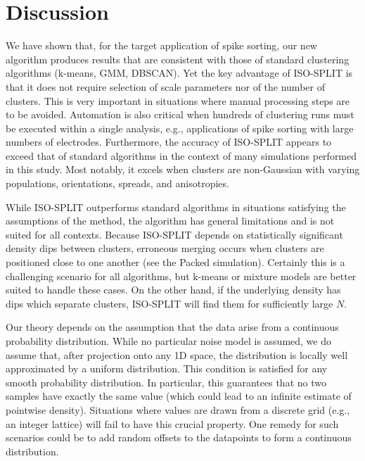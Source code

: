 \documentclass[10pt]{article}
\begin{document}
\section {Discussion}

We have shown that, for the target application of spike sorting, our new algorithm produces results that are consistent with those of standard clustering algorithms (k-means, GMM, DBSCAN). Yet the key advantage of ISO-SPLIT is that it does not require selection of scale parameters nor of the number of clusters. This is very important in situations where manual processing steps are to be avoided.
Automation is also critical when hundreds of clustering runs must be executed within a single analysis, e.g., applications of spike sorting with large numbers of electrodes. Furthermore, the accuracy of ISO-SPLIT appears to exceed that of standard algorithms in the context of many simulations performed in this study. Most notably, it excels when clusters are non-Gaussian with varying populations, orientations, spreads, and anisotropies.

While ISO-SPLIT outperforms standard algorithms in situations satisfying the assumptions of the method, the algorithm has general limitations and is not suited for all contexts. Because ISO-SPLIT depends on statistically significant density dips between clusters, erroneous merging occurs when clusters are positioned close to one another (see the Packed simulation). Certainly this is a challenging scenario for all algorithms, but k-means or mixture models are better suited to handle these cases. On the other hand,
if the underlying density has dips which separate clusters, ISO-SPLIT will
find them for sufficiently large $N$.

Our theory depends on the assumption that the data arise from a continuous probability distribution. While no particular noise model is assumed, we do assume that, after projection onto any 1D space, the distribution is locally well approximated by a uniform distribution. This condition is satisfied for any smooth probability distribution. In particular, this guarantees that no two samples have exactly the same value (which could lead to an infinite estimate of pointwise density). Situations where values are drawn from a discrete grid (e.g., an integer lattice) will fail to have this crucial property. One remedy for such scenarios could be to add random offsets to the datapoints to form a continuous distribution.
\end{document}
